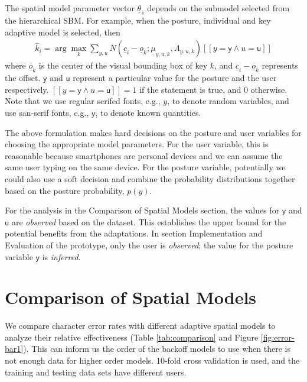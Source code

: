 \documentclass{sigchi}
\begin{document}
The spatial model parameter vector $\underline \theta_s$ depends on the submodel
selected from the hierarchical SBM. For example, when the posture, individual and key adaptive model is selected, then
\begin{align}          
\hat k_i = \arg\max_k \sum_{y, u} N(\underline c_i - \underline o_k; \underline\mu_{y,u,k}, \Lambda_{y,u,k})[[y = \textsf{y} \wedge u = \textsf{u}]]
\end{align}
where $\underline o_k$ is the center of the visual bounding box of key $k$, and $\underline c_i - \underline o_k$ 
represents the offset. $\textsf{y}$ and $\textsf{u}$ represent a particular value for the posture 
and the user respectively. $[[y = \textsf{y} \wedge u = \textsf{u}]] = 1$ if the 
statement is true, and $0$ otherwise. Note that we use regular serifed fonts,
e.g., $y$, to denote random variables, and use san-serif fonts, e.g.,
$\textsf{y}$, to denote known quantities.

The above formulation makes hard decisions on the 
posture and user variables for choosing the appropriate model parameters. For the user variable, 
this is reasonable because smartphones are personal devices and we can assume the 
same user typing on the same device. For the posture variable, potentially we could also 
use a soft decision and combine the probability distributions together based on the posture probability, $p(y)$. 

For the analysis in the Comparison of Spatial Models section, the values for $\textsf{y}$ and $\textsf{u}$ are 
\textit{observed} based on the dataset. This establishes the upper bound for the potential benefits from the adaptations. In section Implementation and Evaluation of the prototype, only the user is \textit{observed}; the value for the posture variable $\textsf{y}$ is \textit{inferred}.

\section{Comparison of Spatial Models}
We compare character error rates with different adaptive spatial models to
analyze their relative effectiveness (Table \ref{tab:comparison} and Figure
\ref{fig:error-bar1}).
This can inform us the order of the backoff models to use when there is not enough data for higher order models.
10-fold cross validation is used, and the training and testing data sets have different users.
\end{document}
